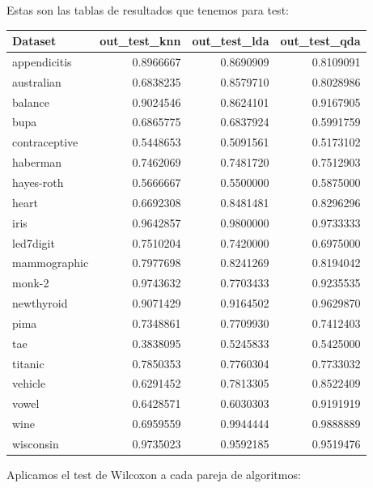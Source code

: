 \vspace{\baselineskip}

Estas son las tablas de resultados que tenemos para test:

\begin{tabular}{l|r|r|r}
\hline
Dataset & out\_test\_knn & out\_test\_lda & out\_test\_qda\\
\hline
appendicitis & 0.8966667 & 0.8690909 & 0.8109091\\
\hline
australian & 0.6838235 & 0.8579710 & 0.8028986\\
\hline
balance & 0.9024546 & 0.8624101 & 0.9167905\\
\hline
bupa & 0.6865775 & 0.6837924 & 0.5991759\\
\hline
contraceptive & 0.5448653 & 0.5091561 & 0.5173102\\
\hline
haberman & 0.7462069 & 0.7481720 & 0.7512903\\
\hline
hayes-roth & 0.5666667 & 0.5500000 & 0.5875000\\
\hline
heart & 0.6692308 & 0.8481481 & 0.8296296\\
\hline
iris & 0.9642857 & 0.9800000 & 0.9733333\\
\hline
led7digit & 0.7510204 & 0.7420000 & 0.6975000\\
\hline
mammographic & 0.7977698 & 0.8241269 & 0.8194042\\
\hline
monk-2 & 0.9743632 & 0.7703433 & 0.9235535\\
\hline
newthyroid & 0.9071429 & 0.9164502 & 0.9629870\\
\hline
pima & 0.7348861 & 0.7709930 & 0.7412403\\
\hline
tae & 0.3838095 & 0.5245833 & 0.5425000\\
\hline
titanic & 0.7850353 & 0.7760304 & 0.7733032\\
\hline
vehicle & 0.6291452 & 0.7813305 & 0.8522409\\
\hline
vowel & 0.6428571 & 0.6030303 & 0.9191919\\
\hline
wine & 0.6959559 & 0.9944444 & 0.9888889\\
\hline
wisconsin & 0.9735023 & 0.9592185 & 0.9519476\\
\hline
\end{tabular}

\vspace{\baselineskip}

Aplicamos el test de Wilcoxon a cada pareja de algoritmos:

\vspace{\baselineskip}

